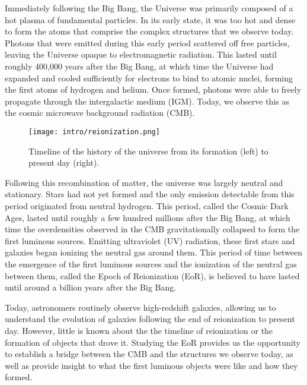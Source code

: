 Immediately following the Big Bang, the Universe was primarily composed of a hot plasma of fundamental particles. In its early state, it was  too hot and dense to form the atoms that comprise the complex structures that we observe today. Photons that were emitted during this early period scattered off free particles, leaving the Universe opaque to electromagnetic radiation. This lasted until roughly 400,000 years after the Big Bang, at which time the Universe had expanded and cooled sufficiently for electrons to bind to atomic nuclei, forming the first atoms of hydrogen and helium. Once formed, photons were able to freely propagate through the intergalactic medium (IGM). Today, we observe this as the cosmic microwave background radiation (CMB).

\begin{figure}[th]
	\centering
	\texttt{[image: intro/reionization.png]}
	\caption[Epoch of Reionization Timeline]{Timeline of the history of the universe from its formation (left) to present day (right).}
	\label{fig:timeline}
\end{figure}

Following this recombination of matter, the universe was largely neutral and stationary.
Stars had not yet formed and the only emission detectable from this period originated
from neutral hydrogen. This period, called the Cosmic Dark Ages, lasted until roughly a few hundred millions after the Big Bang,
at which time the overdensities observed in the CMB gravitationally collapsed to form the first luminous sources.
Emitting ultraviolet (UV) radiation, these first stars and galaxies began ionizing
the neutral gas around them. This period of time between the emergence of the first luminous sources and the
ionization of the neutral gas between them, called the Epoch of Reionization (EoR),
is believed to have lasted until around a billion years after the Big Bang.

Today, astronomers routinely observe high-redshift galaxies, allowing us to understand
the evolution of galaxies following the end of reionization to present day. However, little is known
about the the timeline of reionization or the formation of objects that drove it.
Studying the EoR provides us the opportunity to establish a
bridge between the CMB and the structures we observe today, as well as provide
insight to what the first luminous objects were like and how they formed.
